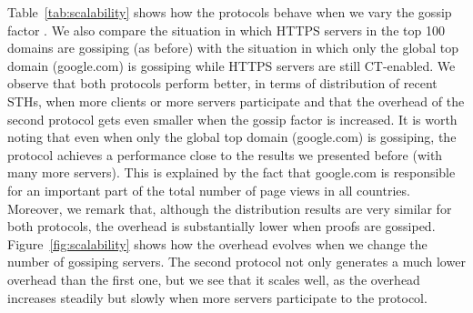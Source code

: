 Table~\ref{tab:scalability} shows how the protocols
behave when we vary the gossip factor . We also compare the situation in which HTTPS servers
in the top 100 domains are gossiping (as before) with the situation in which only the global top domain (google.com) is gossiping while HTTPS servers are still CT-enabled. We observe that both protocols perform better, in terms of distribution of recent STHs, when more clients or more servers participate and that the overhead of the second protocol gets even smaller when the gossip factor is increased. It is worth noting that even when only the global top domain (google.com) is gossiping, the protocol achieves a performance close to the results we presented before (with many more servers). This is explained by the fact that google.com is responsible for an important part of the total number of page views in all countries. Moreover, we remark that, although the distribution results are very similar
for both protocols, the overhead is substantially lower when proofs are gossiped.
Figure~\ref{fig:scalability} shows how the overhead evolves when we change the number
of gossiping servers. The second protocol not only generates a much lower overhead
than the first one, but we see that it scales well, as the overhead increases
steadily but slowly when more servers participate to the protocol.

